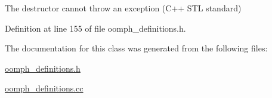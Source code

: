 The destructor cannot throw an exception (C++ S\+TL standard) 



Definition at line 155 of file oomph\+\_\+definitions.\+h.



The documentation for this class was generated from the following files\+:\begin{DoxyCompactItemize}
\item 
\hyperlink{oomph__definitions_8h}{oomph\+\_\+definitions.\+h}\item 
\hyperlink{oomph__definitions_8cc}{oomph\+\_\+definitions.\+cc}\end{DoxyCompactItemize}

